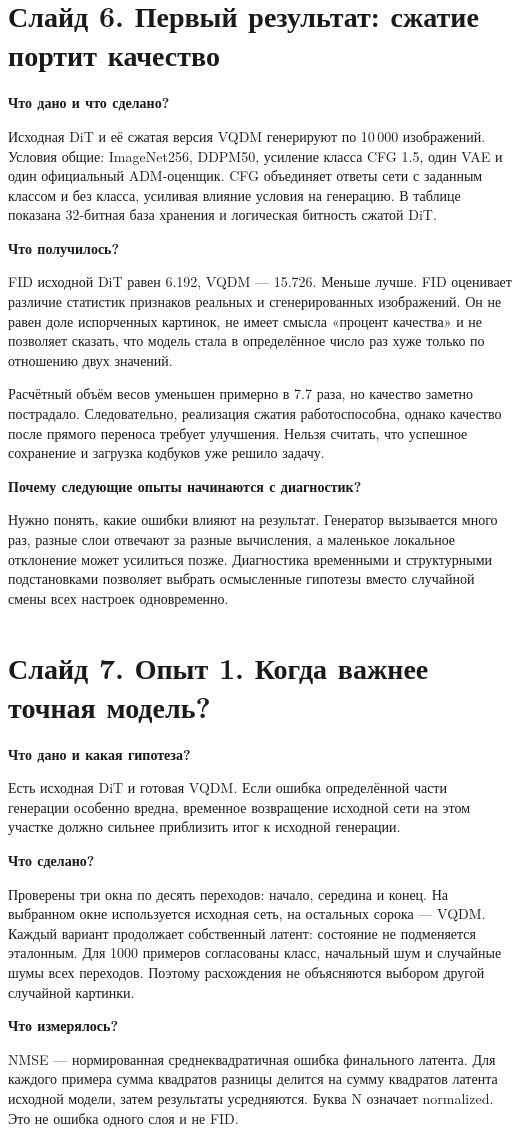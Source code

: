 \documentclass[a4paper,11pt]{article}
\newcommand{\slide}[2]{\clearpage\section*{Слайд #1. #2}}
\newcommand{\question}[1]{\par\textbf{#1}\par}
\begin{document}
\slide{6}{Первый результат: сжатие портит качество}
\question{Что дано и что сделано?}
Исходная DiT и её сжатая версия VQDM генерируют по 10\,000 изображений.
Условия общие: ImageNet256, DDPM50, усиление класса CFG 1.5, один VAE
и один официальный ADM-оценщик. CFG объединяет ответы сети с заданным
классом и без класса, усиливая влияние условия на генерацию.
В таблице показана 32-битная база хранения и логическая битность сжатой DiT.

\question{Что получилось?}
FID исходной DiT равен 6.192, VQDM --- 15.726. Меньше лучше.
FID оценивает различие статистик признаков реальных и сгенерированных
изображений. Он не равен доле испорченных картинок, не имеет смысла
«процент качества» и не позволяет сказать, что модель стала в определённое
число раз хуже только по отношению двух значений.

Расчётный объём весов уменьшен примерно в 7.7 раза, но качество заметно
пострадало. Следовательно, реализация сжатия работоспособна, однако
качество после прямого переноса требует улучшения. Нельзя считать,
что успешное сохранение и загрузка кодбуков уже решило задачу.

\question{Почему следующие опыты начинаются с диагностик?}
Нужно понять, какие ошибки влияют на результат. Генератор вызывается много
раз, разные слои отвечают за разные вычисления, а маленькое локальное
отклонение может усилиться позже. Диагностика временными и структурными
подстановками позволяет выбрать осмысленные гипотезы вместо случайной
смены всех настроек одновременно.

\slide{7}{Опыт 1. Когда важнее точная модель?}
\question{Что дано и какая гипотеза?}
Есть исходная DiT и готовая VQDM. Если ошибка определённой части генерации
особенно вредна, временное возвращение исходной сети на этом участке
должно сильнее приблизить итог к исходной генерации.

\question{Что сделано?}
Проверены три окна по десять переходов: начало, середина и конец.
На выбранном окне используется исходная сеть, на остальных сорока --- VQDM.
Каждый вариант продолжает собственный латент: состояние не подменяется
эталонным. Для 1000 примеров согласованы класс, начальный шум и случайные
шумы всех переходов. Поэтому расхождения не объясняются выбором другой
случайной картинки.

\question{Что измерялось?}
NMSE --- нормированная среднеквадратичная ошибка финального латента.
Для каждого примера сумма квадратов разницы делится на сумму квадратов
латента исходной модели, затем результаты усредняются. Буква N означает
normalized. Это не ошибка одного слоя и не FID.
\end{document}
